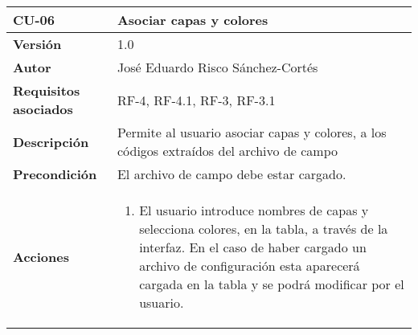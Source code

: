 \begin{longtable}[H]{@{}ll@{}}
\toprule
\begin{minipage}[b]{0.23\columnwidth}\raggedright\strut
\textbf{CU-06}\strut
\end{minipage} & \begin{minipage}[b]{0.71\columnwidth}\raggedright\strut
\textbf{Asociar capas y colores}\strut
\end{minipage}\tabularnewline
\midrule
\endhead
\begin{minipage}[t]{0.23\columnwidth}\raggedright\strut
\textbf{Versión}\strut
\end{minipage} & \begin{minipage}[t]{0.71\columnwidth}\raggedright\strut
1.0\strut
\end{minipage}\tabularnewline
\begin{minipage}[t]{0.23\columnwidth}\raggedright\strut
\textbf{Autor}\strut
\end{minipage} & \begin{minipage}[t]{0.71\columnwidth}\raggedright\strut
José Eduardo Risco Sánchez-Cortés\strut
\end{minipage}\tabularnewline
\begin{minipage}[t]{0.23\columnwidth}\raggedright\strut
\textbf{Requisitos asociados}\strut
\end{minipage} & \begin{minipage}[t]{0.71\columnwidth}\raggedright\strut
RF-4, RF-4.1, RF-3, RF-3.1 \strut
\end{minipage}\tabularnewline
\begin{minipage}[t]{0.23\columnwidth}\raggedright\strut
\textbf{Descripción}\strut
\end{minipage} & \begin{minipage}[t]{0.71\columnwidth}\raggedright\strut
Permite al usuario asociar capas y colores, a los códigos extraídos del archivo de campo\strut
\end{minipage}\tabularnewline
\begin{minipage}[t]{0.23\columnwidth}\raggedright\strut
\textbf{Precondición}\strut
\end{minipage} & \begin{minipage}[t]{0.71\columnwidth}\raggedright\strut
El archivo de campo debe estar cargado.

\end{minipage}\tabularnewline
\begin{minipage}[t]{0.23\columnwidth}\raggedright\strut
\textbf{Acciones}\strut
\end{minipage} & \begin{minipage}[t]{0.71\columnwidth}\raggedright\strut
\begin{enumerate}
\def\labelenumi{\arabic{enumi}.}
\tightlist
\item
  El usuario introduce nombres de capas y selecciona colores, en la tabla, a través de la interfaz. En el caso de haber cargado un archivo de configuración esta aparecerá cargada en la tabla y se podrá modificar por el usuario.


\end{enumerate}
\end{minipage}
\end{longtable}
